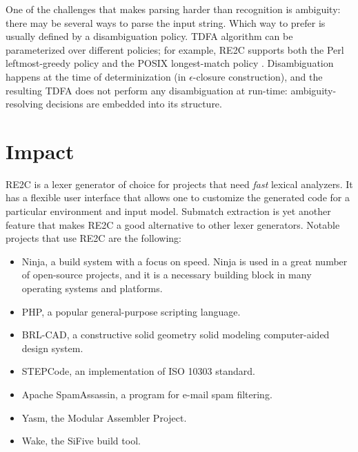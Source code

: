 \documentclass[preprint,12pt, a4paper]{elsarticle}
\begin{document}
\noindent
One of the challenges that makes parsing harder than recognition is ambiguity:
there may be several ways to parse the input string.
Which way to prefer is usually defined by a disambiguation policy.
TDFA algorithm can be parameterized over different policies;
for example, RE2C supports both the Perl leftmost-greedy policy and the POSIX longest-match policy \cite{BorTro19}.
Disambiguation happens at the time of determinization (in $\epsilon$-closure construction),
and the resulting TDFA does not perform any disambiguation at run-time: ambiguity-resolving decisions are embedded into its structure.

\section{Impact}

\noindent
RE2C is a lexer generator of choice for projects that need \emph{fast} lexical analyzers.
It has a flexible user interface that allows one to customize the generated code for a particular environment and input model.
Submatch extraction is yet another feature that makes RE2C a good alternative to other lexer generators.
Notable projects that use RE2C are the following:

\begin{itemize}
\item Ninja, a build system with a focus on speed. \cite{Ninja}
    Ninja is used in a great number of open-source projects,
    and it is a necessary building block in many operating systems and platforms.

\item PHP, a popular general-purpose scripting language. \cite{PHP}

\item BRL-CAD, a constructive solid geometry solid modeling computer-aided design system. \cite{BRLCAD}

\item STEPCode, an implementation of ISO 10303 standard. \cite{STEPCode}

\item Apache SpamAssassin, a program for e-mail spam filtering. \cite{SpamAssassin}

\item Yasm, the Modular Assembler Project. \cite{Yasm}

\item Wake, the SiFive build tool. \cite{Wake}
\end{itemize}
\end{document}
